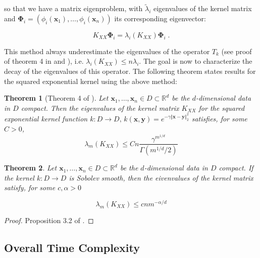 \documentclass{article}
\newcommand{\vect}[1]{\boldsymbol{\mathbf{#1}}}
\newcommand{\R}{\mathbb R}
\newcommand{\norm}[1]{\Vert #1 \Vert}
\newtheorem{theorem}{Theorem}[section]
\begin{document}
so that we have a matrix eigenproblem, with $\tilde \lambda_i$ eigenvalues of the kernel matrix and $\vect \Phi_i = (\phi_i(\vect x_1), \ldots, \phi_i(\vect x_n))$ its corresponding eigenvector:

\begin{equation*}
    K_{XX} \vect \Phi_i = \lambda_i(K_{XX}) \vect \Phi_i \; .
\end{equation*}

This method always underestimate the eigenvalues of the operator $T_k$ (see proof of theorem 4 in \cite{banerjee_parallel_2013} and \cite{baker_numerical_1977}), i.e. $ \lambda_i(K_{XX}) \le n \lambda_i$. The goal is now to characterize the decay of the eigenvalues of this operator. The following theorem states results for the squared exponential kernel using the above method:

\begin{theorem}[Theorem 4 of \cite{banerjee_parallel_2013}]
Let $\vect x_1, \ldots, \vect x_n \in D \subset \R^d$ be the $d$-dimensional data in $D$ compact. Then the eigenvalues of the kernel matrix $K_{XX}$ for the squared exponential kernel function $k: D \to D, \, k(\vect x, \vect y) = e^{-\gamma \norm{\vect x - \vect y}_2^2}$ satisfies, for some $C > 0$,
\begin{equation*}
    \lambda_m(K_{XX}) \le C n \frac{\gamma^{m^{1/d}}}{\Gamma(m^{1/d}/2)}
\end{equation*}
\end{theorem}

\begin{theorem}
Let $\vect x_1, \ldots, \vect x_n \in D \subset \R^d$ be the $d$-dimensional data in $D$ compact. If the kernel $k: D \to D$ is Sobolev smooth, then the eivenvalues of the kernel matrix satisfy, for some $c, \alpha > 0$

\begin{equation*}
    \lambda_m(K_{XX}) \le c n m^{-\alpha / d}
\end{equation*}
\end{theorem}
\begin{proof}
Proposition 3.2 of \cite{todor_robust_2006}.
\end{proof}



\subsection{Overall Time Complexity}
\end{document}
